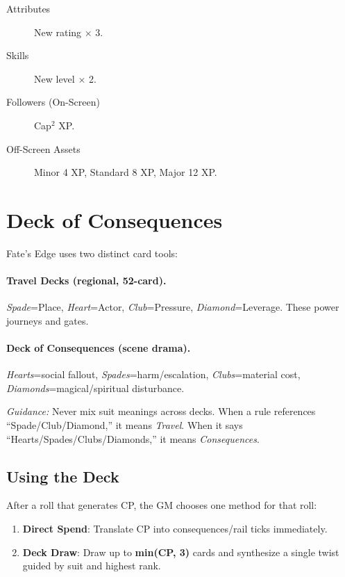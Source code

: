 \begin{description}
\item[Attributes] New rating $\times$ 3.
\item[Skills] New level $\times$ 2.
\item[Followers (On-Screen)] Cap$^2$ XP.
\item[Off-Screen Assets] Minor 4 XP, Standard 8 XP, Major 12 XP.
\end{description}

\section{Deck of Consequences}

Fate's Edge uses two distinct card tools:

\paragraph{Travel Decks (regional, 52-card).}
\emph{Spade}=Place, \emph{Heart}=Actor, \emph{Club}=Pressure, \emph{Diamond}=Leverage. These power journeys and gates.

\paragraph{Deck of Consequences (scene drama).}
\emph{Hearts}=social fallout, \emph{Spades}=harm/escalation, \emph{Clubs}=material cost, \emph{Diamonds}=magical/spiritual disturbance.

\textit{Guidance:} Never mix suit meanings across decks. When a rule references ``Spade/Club/Diamond,'' it means \emph{Travel}. When it says ``Hearts/Spades/Clubs/Diamonds,'' it means \emph{Consequences}.

\subsection{Using the Deck}

After a roll that generates CP, the GM chooses one method for that roll:
\begin{enumerate}
  \item \textbf{Direct Spend}: Translate CP into consequences/rail ticks immediately.
  \item \textbf{Deck Draw}: Draw up to \textbf{min(CP, 3)} cards and synthesize a single twist guided by suit and highest rank.
\end{enumerate}

